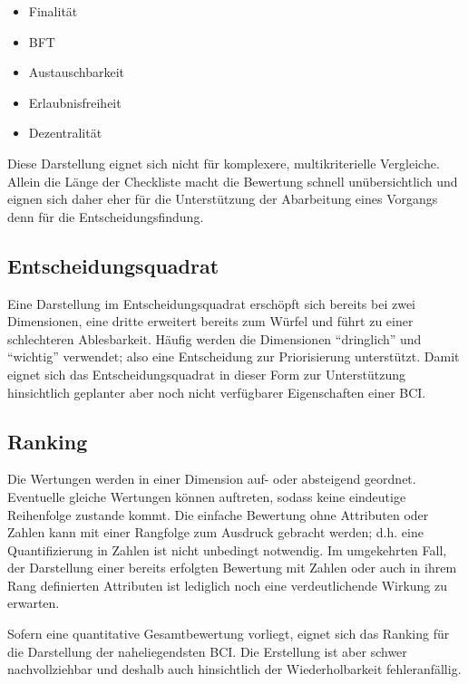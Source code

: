 \begin{itemize}
\item Finalität
\item \gls{BFT}
\item Austauschbarkeit
\item Erlaubnisfreiheit
\item Dezentralität
\end{itemize}

Diese Darstellung eignet sich nicht für komplexere, multikriterielle Vergleiche.
Allein die Länge der Checkliste macht die Bewertung schnell unübersichtlich und eignen sich daher eher für die Unterstützung der Abarbeitung eines Vorgangs denn für die Entscheidungsfindung.

\subsection{Entscheidungsquadrat}

Eine Darstellung im Entscheidungsquadrat erschöpft sich bereits bei zwei Dimensionen, eine dritte erweitert bereits zum Würfel und führt zu einer schlechteren Ablesbarkeit.
Häufig werden die Dimensionen \enquote{dringlich} und \enquote{wichtig} verwendet; also eine Entscheidung zur Priorisierung unterstützt.
Damit eignet sich das Entscheidungsquadrat in dieser Form \zB{} zur Unterstützung hinsichtlich geplanter aber noch nicht verfügbarer Eigenschaften einer \gls{BCI}.

\subsection{Ranking}\label{dep:ranking}

Die Wertungen werden in einer Dimension auf- oder absteigend geordnet. Eventuelle gleiche Wertungen können auftreten, sodass keine eindeutige Reihenfolge zustande kommt.
Die einfache Bewertung ohne Attributen oder Zahlen kann mit einer Rangfolge zum Ausdruck gebracht werden; d.h. eine Quantifizierung in Zahlen ist nicht unbedingt notwendig.
Im umgekehrten Fall, der Darstellung einer bereits erfolgten Bewertung mit Zahlen oder auch in ihrem Rang definierten Attributen ist lediglich noch eine verdeutlichende Wirkung zu erwarten.

Sofern eine quantitative Gesamtbewertung vorliegt, eignet sich das Ranking für die Darstellung der naheliegendsten \gls{BCI}.
Die Erstellung ist aber schwer nachvollziehbar und deshalb auch hinsichtlich der Wiederholbarkeit fehleranfällig.

